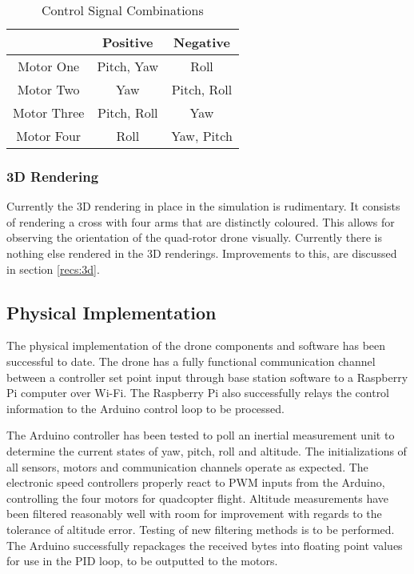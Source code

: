 \begin{table}[H]
	\centering
	\begin{tabular}{c|c|c}
		& Positive & Negative \\
		\hline
		Motor One & Pitch, Yaw & Roll \\
		Motor Two & Yaw & Pitch, Roll \\
		Motor Three & Pitch, Roll & Yaw \\
		Motor Four & Roll & Yaw, Pitch
	\end{tabular}
	\caption{Control Signal Combinations}
\end{table}

\subsubsection{3D Rendering}
Currently the 3D rendering in place in the simulation is rudimentary.  It consists of rendering a cross with four arms that are distinctly coloured.  This allows for observing the orientation of the quad-rotor drone visually.  Currently there is nothing else rendered in the 3D renderings.  Improvements to this, are discussed in section \ref{recs:3d}.

\subsection{Physical Implementation}

The physical implementation of the drone components and software has been successful to date. The drone has a fully functional communication channel between a controller set point input through base station software to a Raspberry Pi computer over Wi-Fi. The Raspberry Pi also successfully relays the control information to the Arduino control loop to be processed.

The Arduino controller has been tested to poll an inertial measurement unit to determine the current states of yaw, pitch, roll and altitude. The initializations of all sensors, motors and communication channels operate as expected. The electronic speed controllers properly react to PWM inputs from the Arduino, controlling the four motors for quadcopter flight. Altitude measurements have been filtered reasonably well with room for improvement with regards to the tolerance of altitude error. Testing of new filtering methods is to be performed. The Arduino successfully repackages the received bytes into floating point values for use in the PID loop, to be outputted to the motors.

